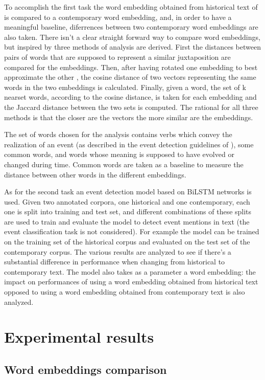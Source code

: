 \documentclass[runningheads]{llncs}
\begin{document}
To accomplish the first task the word embedding obtained from historical text of \cite{histo} is compared to a contemporary word embedding, and, in order to have a meaningful baseline, diferrences between two contemporary word embeddings are also taken. There isn't a clear straight forward way to compare word embeddings, but inspired by \cite{embcomp} three methods of analysis are derived. First the distances between pairs of words that are supposed to represent a similar juxtaposition are compared for the embeddings. Then, after having rotated one embedding to best approximate the other \cite{rotation}, the cosine distance of two vectors representing the same words in the two embeddings is calculated. Finally, given a word, the set of k nearset words, according to the cosine distance, is taken for each embedding and the Jaccard distance between the two sets is computed. The rational for all three methods is that the closer are the vectors the more similar are the embeddings.

The set of words chosen for the analysis contains verbs which convey the realization of an event (as described in the event detection guidelines of \cite{histo}), some common words, and words whose meaning is supposed to have evolved or changed during time. Common words are taken as a baseline to measure the distance between other words in the different embeddings.

As for the second task an event detection model based on BiLSTM networks \cite{bilstm} is used. Given two annotated corpora, one historical and one contemporary, each one is split into training and test set, and different combinations of these splits are used to train and evaluate the model to detect event mentions in text (the event classification task is not considered). For example the model can be trained on the training set of the historical corpus and evaluated on the test set of the contemporary corpus. The various results are analyzed to see if there's a substantial difference in performance when changing from historical to contemporary text. The model also takes as a parameter a word embedding: the impact on performances of using a word embedding obtained from historical text opposed to using a word embedding obtained from contemporary text is also analyzed.

\section{Experimental results}

\subsection{Word embeddings comparison}
\end{document}
